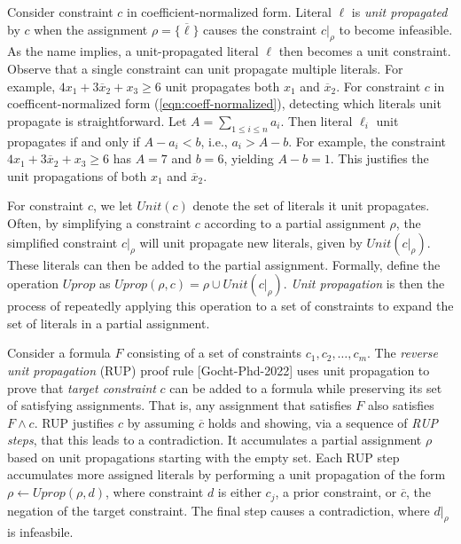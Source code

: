 \documentclass{easychair}
\renewcommand{\obar}[1]{\overline{#1}}
\newcommand{\lit}{\ell}
\newcommand{\assign}{\rho}
\newcommand{\simplify}[2]{#1|_{#2}}
\newcommand{\unit}{\mathit{Unit}}
\newcommand{\uprop}{\mathit{Uprop}}
\begin{document}
Consider constraint $c$ in coefficient-normalized form.  Literal
$\lit$ is {\em unit propagated} by $c$ when the assignment $\assign =
\{ \obar{\lit} \}$ causes the constraint $\simplify{c}{\assign}$ to become
infeasible.  As the name implies, a unit-propagated literal $\lit$ then becomes a unit constraint.
Observe that a single constraint can unit propagate
multiple literals.  For example, $4 x_1 + 3 \obar{x}_2 + x_3 \geq 6$
unit propagates both $x_1$ and $\obar{x}_2$.
For constraint $c$ in coefficent-normalized form
(\ref{eqn:coeff-normalized}), detecting which literals unit propagate
is straightforward.  Let $A = \sum_{1 \leq i \leq n} a_{i}$.  Then
literal $\lit_{i}$ unit propagates if and only if $A - a_{i} < b$,
i.e., $a_{i} > A - b$.  For example, the constraint $4 x_1 + 3
\obar{x}_2 + x_3 \geq 6$ has $A = 7$ and $b=6$, yielding $A-b=1$.
This justifies the unit propagations of both $x_1$ and $\obar{x}_2$.

For constraint $c$, we let $\unit(c)$ denote the set of literals it
unit propagates.  Often, by simplifying a constraint $c$ according to
a partial assignment $\assign$, the simplified constraint $\simplify{c}{\assign}$
will unit propagate new literals, given by $\unit(\simplify{c}{\assign})$.  These
literals can then be added to the partial assignment.  Formally,
define the operation $\uprop$ as  $\uprop(\assign, c) = \assign \cup \unit(\simplify{c}{\assign})$.
{\em Unit propagation} is then the process of
repeatedly applying this operation to a set of constraints to expand the
set of literals in a partial assignment.

Consider a formula $F$ consisting of a set of constraints $c_1, c_2,
\ldots, c_m$.  The {\em reverse unit propagation} (RUP) proof rule
      [Gocht-Phd-2022] uses unit propagation to prove that
      \emph{target constraint} $c$ can be added to a formula while
      preserving its set of satisfying assignments.  That is, any
      assignment that satisfies $F$ also satisfies $F \land c$.  RUP
      justifies $c$ by assuming $\obar{c}$ holds and showing, via a
      sequence of \emph{RUP steps}, that this leads to a
      contradiction.  It accumulates a partial assignment $\assign$
      based on unit propagations starting with the empty set.
      Each RUP step accumulates more assigned
      literals by performing a unit propagation of the form
      $\assign \leftarrow \uprop(\assign, d)$, where constraint $d$ is either
      $c_j$, a prior constraint, or $\obar{c}$, the negation of the
      target constraint.  The final step causes a contradiction,
      where $\simplify{d}{\assign}$ is infeasbile.
\end{document}
